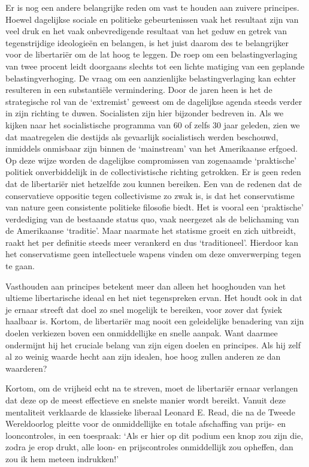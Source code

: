 \documentclass[
  a5paper,
  smalldemyvopaper,10pt,twoside,onecolumn,openright,extrafontsizes,hidelinks]{memoir}
\begin{document}
Er is nog een andere belangrijke reden om vast te houden aan zuivere
principes. Hoewel dagelijkse sociale en politieke gebeurtenissen vaak
het resultaat zijn van veel druk en het vaak onbevredigende resultaat
van het geduw en getrek van tegenstrijdige ideologieën en belangen, is
het juist daarom des te belangrijker voor de libertariër om de lat hoog
te leggen. De roep om een belastingverlaging van twee procent leidt
doorgaans slechts tot een lichte matiging van een geplande
belastingverhoging. De vraag om een aanzienlijke belastingverlaging kan
echter resulteren in een substantiële vermindering. Door de jaren heen
is het de strategische rol van de `extremist' geweest om de dagelijkse
agenda steeds verder in zijn richting te duwen. Socialisten zijn hier
bijzonder bedreven in. Als we kijken naar het socialistische programma
van 60 of zelfs 30 jaar geleden, zien we dat maatregelen die destijds
als gevaarlijk socialistisch werden beschouwd, inmiddels onmisbaar zijn
binnen de `mainstream' van het Amerikaanse erfgoed. Op deze wijze worden
de dagelijkse compromissen van zogenaamde `praktische' politiek
onverbiddelijk in de collectivistische richting getrokken. Er is geen
reden dat de libertariër niet hetzelfde zou kunnen bereiken. Een van de
redenen dat de conservatieve oppositie tegen collectivisme zo zwak is,
is dat het conservatisme van nature geen consistente politieke filosofie
biedt. Het is vooral een `praktische' verdediging van de bestaande
status quo, vaak neergezet als de belichaming van de Amerikaanse
`traditie'. Maar naarmate het statisme groeit en zich uitbreidt, raakt
het per definitie steeds meer verankerd en dus `traditioneel'. Hierdoor
kan het conservatisme geen intellectuele wapens vinden om deze
omverwerping tegen te gaan.

Vasthouden aan principes betekent meer dan alleen het hooghouden van het
ultieme libertarische ideaal en het niet tegenspreken ervan. Het houdt
ook in dat je ernaar streeft dat doel zo snel mogelijk te bereiken, voor
zover dat fysiek haalbaar is. Kortom, de libertariër mag nooit een
geleidelijke benadering van zijn doelen verkiezen boven een
onmiddellijke en snelle aanpak. Want daarmee ondermijnt hij het cruciale
belang van zijn eigen doelen en principes. Als hij zelf al zo weinig
waarde hecht aan zijn idealen, hoe hoog zullen anderen ze dan waarderen?

Kortom, om de vrijheid echt na te streven, moet de libertariër ernaar
verlangen dat deze op de meest effectieve en snelste manier wordt
bereikt. Vanuit deze mentaliteit verklaarde de klassieke liberaal
Leonard E. Read, die na de Tweede Wereldoorlog pleitte voor de
onmiddellijke en totale afschaffing van prijs- en looncontroles, in een
toespraak: `Als er hier op dit podium een knop zou zijn die, zodra je
erop drukt, alle loon- en prijscontroles onmiddellijk zou opheffen, dan
zou ik hem meteen indrukken!'
\end{document}
